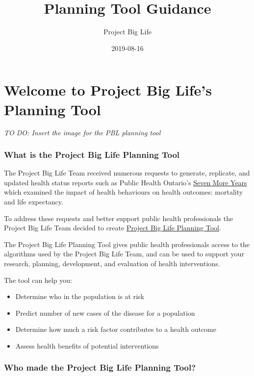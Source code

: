\documentclass[]{book}
\title{Planning Tool Guidance}
\author{Project Big Life}
\date{2019-08-16}
\providecommand{\tightlist}{%
  \setlength{\itemsep}{0pt}\setlength{\parskip}{0pt}}
\begin{document}
\maketitle

{
\setcounter{tocdepth}{1}
\tableofcontents
}
\chapter{Welcome to Project Big Life's Planning
Tool}\label{welcome-to-project-big-lifes-planning-tool}

\emph{TO DO: Insert the image for the PBL planning tool}

\subsection{What is the Project Big Life Planning
Tool}\label{what-is-the-project-big-life-planning-tool}

The Project Big Life Team received numerous requests to generate,
replicate, and updated health status reports such as Public Health
Ontario's
\href{https://www.ices.on.ca/Publications/Atlases-and-Reports/2012/Seven-More-Years}{Seven
More Years} which examined the impact of health behaviours on health
outcomes: mortality and life expectancy.

To address these requests and better support public health professionals
the Project Big Life Team decided to create
\href{http://policy.projectbiglife.ca/}{Project Big Life Planning Tool}.

The Project Big Life Planning Tool gives public health professionals
access to the algorithms used by the Project Big Life Team, and can be
used to support your research, planning, development, and evaluation of
health interventions.

The tool can help you:

\begin{itemize}
\tightlist
\item
  Determine who in the population is at risk
\item
  Predict number of new cases of the disease for a population
\item
  Determine how much a risk factor contributes to a health outcome
\item
  Assess health benefits of potential interventions
\end{itemize}

\subsection{Who made the Project Big Life Planning
Tool?}\label{who-made-the-project-big-life-planning-tool}
\end{document}
